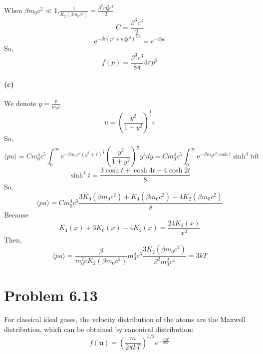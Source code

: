 \documentclass{article}
\begin{document}
When $\beta m_0c^2 \ll 1$,$\frac{1}{K_2(\beta m_0c^2)}= \frac{\beta^2 m_0^2 c^4}{2}$.
\begin{equation}
C=\frac{\beta^3 c^3}{2}
\end{equation}
\begin{equation}
\mathrm{e}^{-\beta c (p^2+m_0^2c^2)^{1/2}} = e^{-\beta pc}
\end{equation}
So,
\begin{equation}
f(p)=\frac{\beta^3 c^3}{8 \pi} 4\pi p^2 
\end{equation}

\paragraph*{(c)}
We denote $y=\frac{p}{m_0c}$
\begin{equation}
u=(\frac{y^2}{1+y^2})^{\frac{1}{2}} c 
\end{equation}
So,
\begin{equation}
\langle pu \rangle = C m_0^4c^5 \int_0^{\infty} \mathrm{e}^{-\beta m_0c^2 (y^2+1)^{\frac{1}{2}}} (\frac{y^2}{1+y^2})^{\frac{1}{2}} y^3 dy =  C m_0^4c^5 \int_0^{\infty} \mathrm{e}^{-\beta m_0c^2 \cosh t} \sinh^4 t dt
\end{equation}
\begin{equation}
\sinh^4t = \frac{3\cosh t + \cosh 4t - 4\cosh 2t}{8}
\end{equation}
So,
\begin{equation}
\langle pu \rangle = C m_0^4c^5 \frac{3K_0(\beta m_0c^2) + K_4(\beta m_0c^2)  - 4K_2(\beta m_0c^2)}{8}
\end{equation}
Because
\begin{equation}
K_4(x)+3K_0(x)-4K_2(x)= \frac{24K_2(x)}{x^2}
\end{equation}
Then,
\begin{equation}
\langle pu \rangle = \frac{\beta}{m_0^2 c K_2(\beta m_0 c^2)} m_0^4c^5 \frac{3K_2(\beta m_0 c^2)}{\beta^2 m_0^2 c^4} = 3kT
\end{equation}

\section*{Problem 6.13}
For classical ideal gases, the velocity distribution of the atoms are the Maxwell distribution, which can be obtained by canonical distribution:
\begin{equation}
f(\mathbf{u}) = \left(\frac{m}{2\pi kT}\right)^{3/2}e^{-\frac{m\mathbf{u}^2}{2kT}}
\end{equation}
\end{document}
